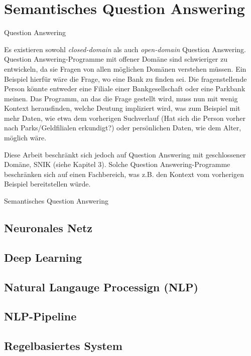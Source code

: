 \section{Semantisches Question Answering}

\begin{definition}{Question Answering}
\end{definition}

Es existieren sowohl \emph{closed-domain} als auch \emph{open-domain} Question Answering.
Question Answering-Programme mit offener Domäne sind schwieriger zu entwickeln,
da sie Fragen von allen möglichen Domänen verstehen müssen.
Ein Beispiel hierfür wäre die Frage, wo eine Bank zu finden sei.
Die fragenstellende Person könnte entweder eine Filiale einer Bankgesellschaft oder eine Parkbank meinen.
Das Programm, an das die Frage gestellt wird, muss nun mit wenig Kontext herausfinden,
welche Deutung impliziert wird, was zum Beispiel mit mehr Daten,
wie etwa dem vorherigen Suchverlauf (Hat sich die Person vorher nach Parks/Geldfilialen erkundigt?)
oder persönlichen Daten, wie dem Alter, möglich wäre.

Diese Arbeit beschränkt sich jedoch auf Question Answering mit geschlossener Domäne, SNIK (siehe Kapitel 3).
Solche Question Answering-Programme beschränken sich auf einen Fachbereich,
was z.B. den Kontext vom vorherigen Beispiel bereitstellen würde.

\begin{definition}{Semantisches Question Answering}
\end{definition}

\subsection{Neuronales Netz}

\subsection{Deep Learning}

\subsection{Natural Langauge Processign (NLP)}

\subsection{NLP-Pipeline}

\subsection{Regelbasiertes System}

